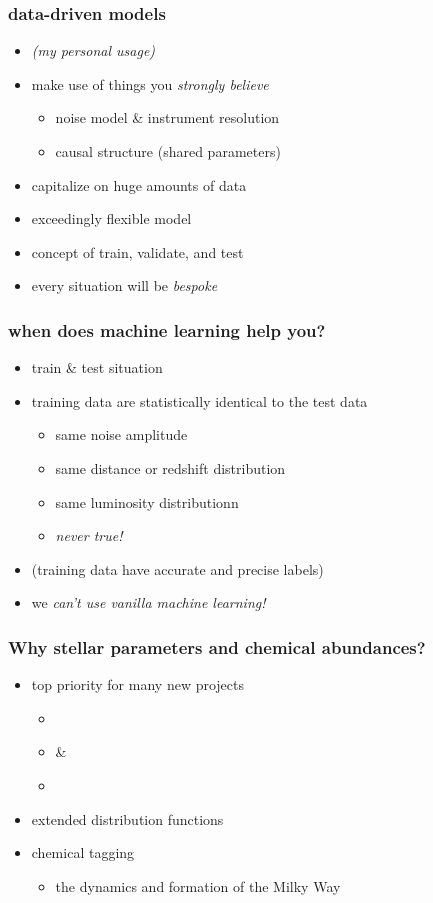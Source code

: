 \documentclass[pdftex]{beamer}
\begin{document}
\begin{frame}
  \frametitle{data-driven models}
  \begin{itemize}
  \item \textit{(my personal usage)}
  \item make use of things you \emph{strongly believe}
    \begin{itemize}
    \item noise model \& instrument resolution
    \item causal structure (shared parameters)
    \end{itemize}
  \item capitalize on huge amounts of data
  \item exceedingly flexible model
  \item concept of train, validate, and test
  \item every situation will be \emph{bespoke}
  \end{itemize}
\end{frame}

\begin{frame}
  \frametitle{when does machine learning help you?}
  \begin{itemize}
  \item train \& test situation
  \item training data are statistically identical to the test data
    \begin{itemize}
    \item same noise amplitude
    \item same distance or redshift distribution
    \item same luminosity distributionn
    \item \emph{never true!}
    \end{itemize}
  \item (training data have accurate and precise labels)
  \item we \emph{can't use vanilla machine learning!}
  \end{itemize}
\end{frame}

\begin{frame}
  \frametitle{Why stellar parameters and chemical abundances?}
  \begin{itemize}
  \item top priority for many new projects
    \begin{itemize}
    \item \gaia
    \item {} \& 
    \item \sdssiii\ \apogee
    \end{itemize}
  \item extended distribution functions
  \item chemical tagging
    \begin{itemize}
    \item the dynamics and formation of the Milky Way
    \end{itemize}
  \end{itemize}
\end{frame}
\end{document}
